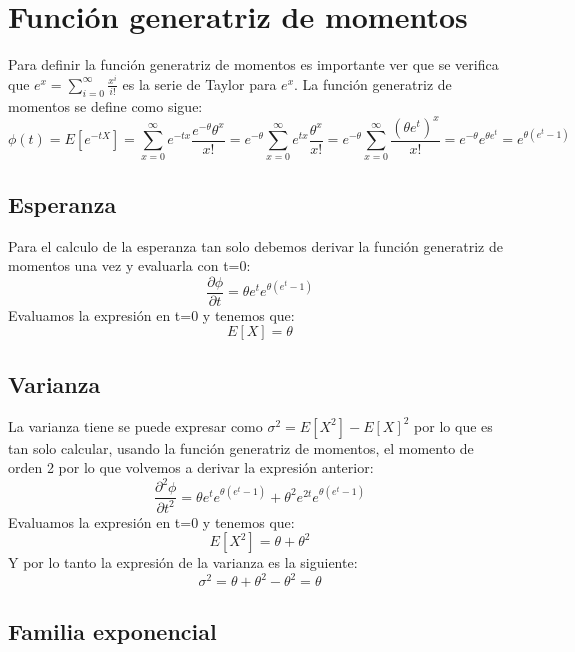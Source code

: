 \documentclass[a4paper, 10pt]{article} %
\newcounter{def}
\begin{document}
\section{Función generatriz de momentos}
Para definir la función generatriz de momentos es importante ver que se verifica que $e^x=\sum_{i=0}^{\infty}\frac{x^i}{i!}$ es la serie de Taylor para $e^x$.
La función generatriz de momentos se define como sigue:
$$\phi(t)=E[e^{-tX}]=\sum_{x=0}^{\infty}e^{-t x}\frac{e^{-\theta}\theta^x}{x!}=e^{-\theta}\sum_{x=0}^{\infty}e^{t x}\frac{\theta^x}{x!}=e^{-\theta}\sum_{x=0}^{\infty}\frac{(\theta e^t)^x}{x!}=e^{-\theta}e^{\theta e^t}=e^{\theta(e^t-1)}$$
\subsection{Esperanza}
Para el calculo de la esperanza tan solo debemos derivar la función generatriz de momentos una vez y evaluarla con t=0:
$$\frac{\partial\phi}{\partial t} = \theta e^t e^{\theta(e^t-1)}$$
Evaluamos la expresión en t=0 y tenemos que:
$$E[X]=\theta$$
\subsection{Varianza}
La varianza tiene se puede expresar como $\sigma^2=E[X^2]-E[X]^2$ por lo que es tan solo calcular, usando la función generatriz de momentos, el momento de orden 2 por lo que volvemos a derivar la expresión anterior:
$$\frac{\partial^2\phi}{\partial t^2} = \theta e^t e^{\theta(e^t-1)}+\theta^2 e^{2t} e^{\theta(e^t-1)}$$
Evaluamos la expresión en t=0 y tenemos que:
$$E[X^2]=\theta+\theta^2$$
Y por lo tanto la expresión de la varianza es la siguiente:
$$\sigma^2=\theta+\theta^2-\theta^2=\theta$$

\subsection{Familia exponencial}
\end{document}
